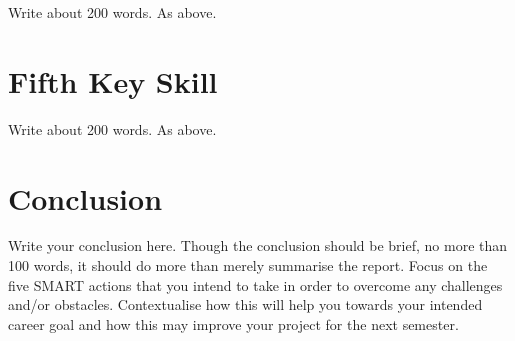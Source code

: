 \documentclass{scrartcl}
\begin{document}
Write about 200 words. As above.

\section{Fifth Key Skill}

Write about 200 words. As above.

\section{Conclusion}

Write your conclusion here. Though the conclusion should be brief, no more than 100 words, it should do more than merely summarise the report. Focus on the five SMART actions that you intend to take in order to overcome any challenges and/or obstacles. Contextualise how this will help you towards your intended career goal and how this may improve your project for the next semester.



\end{document}
